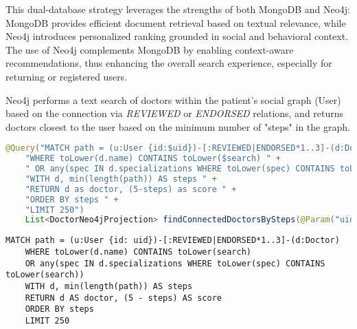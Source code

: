This dual-database strategy leverages the strengths of both MongoDB and Neo4j: MongoDB provides efficient document retrieval based on textual relevance, while Neo4j introduces personalized ranking grounded in social and behavioral context. The use of Neo4j complements MongoDB by enabling context-aware recommendations, thus enhancing the overall search experience, especially for returning or registered users. 

Neo4j performs a text search of doctors within the patient's social graph (User) based on the connection via \textit{REVIEWED} or \textit{ENDORSED} relations, and returns doctors closest to the user based on the minimum number of "steps" in the graph.

\begin{lstlisting}[language=java]
	@Query("MATCH path = (u:User {id:$uid})-[:REVIEWED|ENDORSED*1..3]-(d:Doctor) " +
	"WHERE toLower(d.name) CONTAINS toLower($search) " +
	" OR any(spec IN d.specializations WHERE toLower(spec) CONTAINS toLower($search)) " +
	"WITH d, min(length(path)) AS steps " +
	"RETURN d as doctor, (5-steps) as score " +
	"ORDER BY steps " +
	"LIMIT 250")
	List<DoctorNeo4jProjection> findConnectedDoctorsBySteps(@Param("uid") String patientId, @Param("search") String search);
\end{lstlisting}


\begin{lstlisting}[language=cypher]
	MATCH path = (u:User {id: uid})-[:REVIEWED|ENDORSED*1..3]-(d:Doctor)
	WHERE toLower(d.name) CONTAINS toLower(search)
	OR any(spec IN d.specializations WHERE toLower(spec) CONTAINS toLower(search))
	WITH d, min(length(path)) AS steps
	RETURN d AS doctor, (5 - steps) AS score
	ORDER BY steps
	LIMIT 250
\end{lstlisting}

